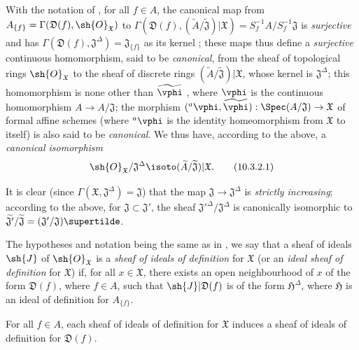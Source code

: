 \begin{env}[10.3.2]
\label{I.10.3.2}
With the notation of , for all $f\in A$, the canonical map from $A_{\{f\}}=\Gamma(\mathfrak{D}(f),\sh{O}_\mathfrak{X})$ to $\Gamma(\mathfrak{D}(f),(\widetilde{A}/\widetilde{\mathfrak{J}})|\mathfrak{X})=S_f^{-1}A/S_f^{-1}\mathfrak{J}$ is \emph{surjective} and has $\Gamma(\mathfrak{D}(f),\mathfrak{J}^\Delta)=\mathfrak{J}_{\{f\}}$ as its kernel ; these maps thus define a \emph{surjective} continuous homomorphism, said to be \emph{canonical}, from the sheaf of topological rings $\sh{O}_\mathfrak{X}$ to the sheaf of discrete rings $(\widetilde{A}/\widetilde{\mathfrak{J}})|\mathfrak{X}$, whose kernel is $\mathfrak{J}^\Delta$; this homomorphism is none other than $\widetilde{\vphi}$ , where $\vphi$ is the continuous homomorphism $A\to A/\mathfrak{J}$; the morphism $({}^a\vphi,\widetilde{\vphi}):\Spec(A/\mathfrak{J})\to\mathfrak{X}$ of formal affine schemes (where ${}^a\vphi$ is the identity homeomorphism from $\mathfrak{X}$ to itself) is also said to be \emph{canonical}.
We thus have, according to the above, a \emph{canonical isomorphism}
\[
\label{I.10.3.2.1}
  \sh{O}_\mathfrak{X}/\mathfrak{J}^\Delta\isoto(\widetilde{A}/\widetilde{\mathfrak{J}})|\mathfrak{X}.
  \tag{10.3.2.1}
\]

It is clear (since $\Gamma(\mathfrak{X},\mathfrak{J}^\Delta)=\mathfrak{J}$) that the map $\mathfrak{J}\to\mathfrak{J}^\Delta$ is \emph{strictly increasing}; according to the above, for $\mathfrak{J}\subset\mathfrak{J}'$, the sheaf ${\mathfrak{J}'}^\Delta/\mathfrak{J}^\Delta$ is canonically isomorphic to $\widetilde{\mathfrak{J}'}/\widetilde{\mathfrak{J}}=(\mathfrak{J}'/\mathfrak{J})\supertilde$.
\end{env}

\begin{env}[10.3.3]
\label{I.10.3.3}
The hypotheses and notation being the same as in , we say that a sheaf of ideals $\sh{J}$ of $\sh{O}_\mathfrak{X}$ is a \emph{sheaf of ideals of definition} for $\mathfrak{X}$ (or an \emph{ideal sheaf of definition} for $\mathfrak{X}$) if, for all $x\in\mathfrak{X}$, there exists an open neighbourhood of $x$ of the form $\mathfrak{D}(f)$, where $f\in A$, such that $\sh{J}|\mathfrak{D}(f)$ is of the form $\mathfrak{H}^\Delta$, where $\mathfrak{H}$ is an ideal of definition for $A_{\{f\}}$.
\end{env}

\begin{proposition}[10.3.4]
\label{I.10.3.4}
For all $f\in A$, each sheaf of ideals of definition for $\mathfrak{X}$ induces a sheaf of ideals of definition for $\mathfrak{D}(f)$.
\end{proposition}

